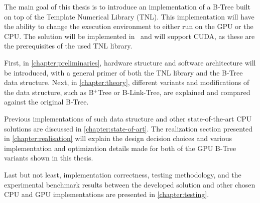 The main goal of this thesis is to introduce an implementation of a B-Tree built on top of the Template Numerical Library (TNL). This implementation will have the ability to change the execution environment to either run on the GPU or the CPU. The solution will be implemented in \CC\ and will support CUDA, as these are the prerequisites of the used TNL library.

First, in \cref{chapter:preliminaries}, hardware structure and software architecture will be introduced, with a general primer of both the TNL library and the B-Tree data structure. Next, in \cref{chapter:theory}, different variants and modifications of the data structure, such as B$^+$Tree or B-Link-Tree, are explained and compared against the original B-Tree.

Previous implementations of such data structure and other state-of-the-art CPU solutions are discussed in \cref{chapter:state-of-art}. The realization section presented in \cref{chapter:realisation} will explain the design decision choices and various implementation and optimization details made for both of the GPU B-Tree variants shown in this thesis.

Last but not least, implementation correctness, testing methodology, and the experimental benchmark results between the developed solution and other chosen CPU and GPU implementations are presented in \cref{chapter:testing}.